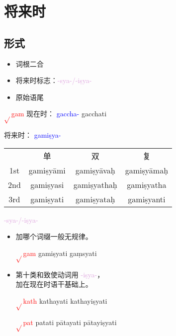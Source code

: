 \documentclass[17pt]{beamer}
\newcommand{\verbroot}[1]{\textcolor{red}{$\sqrt{}$#1}}
\newcommand{\verbstem}[1]{\textcolor{blue}{#1\nobreakdash-}}
\newcommand{\fullpada}[1]{\textcolor{OliveGreen}{#1}}
\newcommand{\pratyaya}[1]{\textcolor{Plum}{#1}}
\begin{document}
\section{将来时}
\begin{frame}{\insertsection }
    \small
    \tableofcontents[currentsection]
\end{frame}

\subsection{形式}
\begin{frame}{\insertsubsection}
  \begin{itemize}
    \item 词根二合
    \item 将来时标志：\pratyaya{\nobreakdash-sya\nobreakdash-/\nobreakdash-iṣya\nobreakdash-}
    \item 原始语尾  
  \end{itemize}
\end{frame}

\begin{frame}{\verbroot{gam}}
  %\small
  现在时： \verbstem{\nobreakdash gaccha} \fullpada{\nobreakdash gacchati}
  \bigskip


  将来时： \verbstem{\nobreakdash gamiṣya} 
  \bigskip

  \centering
  \begin{tabular}{@{}cccc@{}} %
    & 单 & 双 & 复  \\
    1st & \fullpada{gamiṣyāmi} & \fullpada{gamiṣyāvaḥ}  & \fullpada{gamiṣyāmaḥ}  \\
    2nd & \fullpada{gamiṣyasi} & \fullpada{gamiṣyathaḥ} & \fullpada{gamiṣyatha}   \\
    3rd & \fullpada{gamiṣyati} & \fullpada{gamiṣyataḥ} & \fullpada{gamiṣyanti}  \\
  \end{tabular}
\end{frame}

\begin{frame}{\pratyaya{\nobreakdash-sya\nobreakdash-/\nobreakdash-iṣya\nobreakdash-}}
  \begin{itemize}
    \item 加哪个词缀一般无规律。

    \verbroot{gam} \fullpada{gamiṣyati}  \fullpada{gaṃsyati}
    \item 第十类和致使动词用 \pratyaya{\nobreakdash-iṣya\nobreakdash-}，\\加在现在时语干基础上。
    
    \verbroot{kath} \fullpada{kathayati} \fullpada{kathayiṣyati} 

    \verbroot{pat} \fullpada{patati} \fullpada{pātayati} \fullpada{pātayiṣyati} 
  \end{itemize}    
\end{frame}
\end{document}
